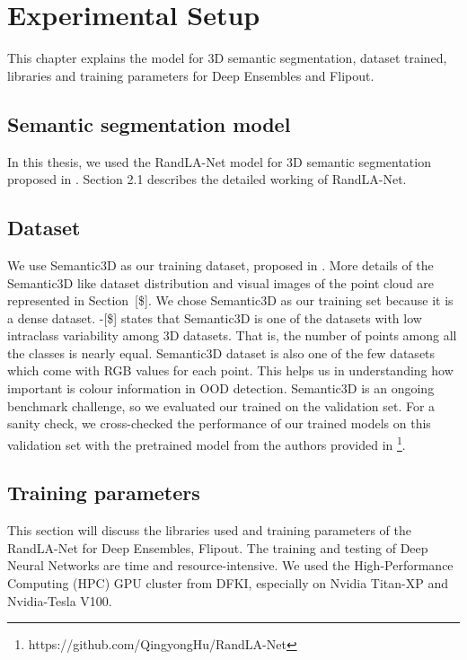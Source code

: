 

    \chapter{Experimental Setup}
    This chapter explains the model for 3D semantic segmentation, dataset trained, libraries and training parameters for Deep Ensembles and Flipout.

    \section{Semantic segmentation model}
    In this thesis, we used the RandLA-Net model for 3D semantic segmentation proposed in \cite{Hu_2020_CVPR_Randla}.
    Section 2.1 describes the detailed working of RandLA-Net. 

    \section{Dataset}
    We use Semantic3D as our training dataset, proposed in \cite{hackel2017semantic3d}.
    More details of the Semantic3D like dataset distribution and visual images of the point cloud are represented in Section~[\$].
    We chose Semantic3D as our training set because it is a dense dataset.
    \cite{}-[\$] states that Semantic3D is one of the datasets with low intraclass variability among 3D datasets.
    That is, the number of points among all the classes is nearly equal.
    Semantic3D dataset is also one of the few datasets which come with RGB values for each point.
    This helps us in understanding how important is colour information in OOD detection.
    Semantic3D is an ongoing benchmark challenge, so we evaluated our trained on the validation set.
    For a sanity check, we cross-checked the performance of our trained models on this validation set with the pretrained model from the authors provided in \footnote[1]{https://github.com/QingyongHu/RandLA-Net}.

    \section{Training parameters}
    This section will discuss the libraries used and training parameters of the RandLA-Net for Deep Ensembles, Flipout.
    The training and testing of Deep Neural Networks are time and resource-intensive.
    We used the High-Performance Computing (HPC) GPU cluster from DFKI, especially on Nvidia Titan-XP and Nvidia-Tesla V100.
